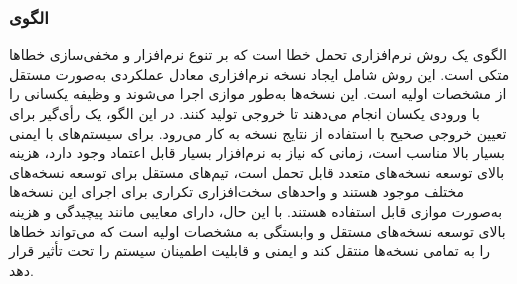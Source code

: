 \subsubsection{الگوی }
\label{ArmoushSWNVerProgSec}
\begin{RTL}
الگوی  یک روش نرم‌افزاری تحمل خطا
است که بر تنوع نرم‌افزار و مخفی‌سازی خطاها متکی است.
این روش شامل ایجاد  نسخه نرم‌افزاری معادل عملکردی
 به‌صورت مستقل از مشخصات اولیه است.
این نسخه‌ها به‌طور موازی اجرا می‌شوند و وظیفه یکسانی را با
ورودی یکسان انجام می‌دهند تا  خروجی تولید کنند.
در این الگو، یک رأی‌گیر برای تعیین خروجی صحیح با استفاده از نتایج
 نسخه به کار می‌رود.  برای سیستم‌های با ایمنی بسیار بالا مناسب است،
زمانی که نیاز به نرم‌افزار بسیار قابل اعتماد وجود دارد،
هزینه بالای توسعه نسخه‌های متعدد قابل تحمل است، تیم‌های مستقل برای توسعه نسخه‌های
مختلف موجود هستند و واحدهای سخت‌افزاری تکراری برای اجرای این
نسخه‌ها به‌صورت موازی قابل استفاده هستند. با این حال، 
دارای معایبی مانند پیچیدگی و هزینه بالای توسعه نسخه‌های مستقل
و وابستگی به مشخصات اولیه است که می‌تواند خطاها را به تمامی نسخه‌ها
منتقل کند و ایمنی و قابلیت اطمینان سیستم را تحت تأثیر قرار دهد.
\end{RTL}